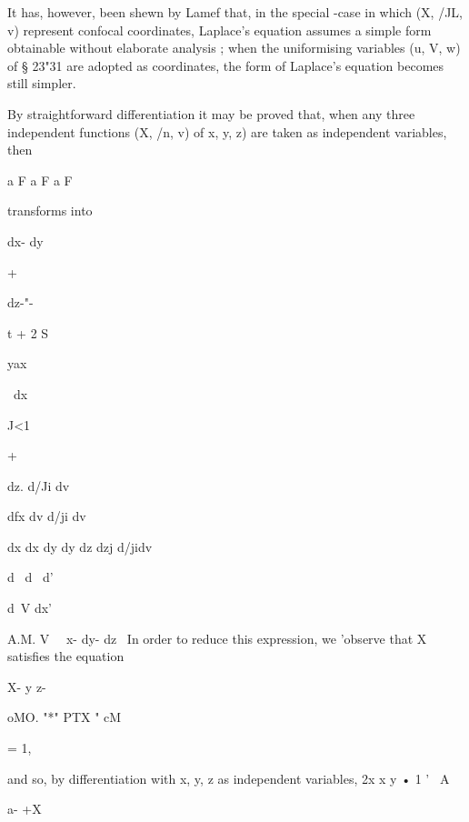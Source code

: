 {{{It has, however, been shewn by Lamef that, in the special -case in which 
(X, /JL, v) represent confocal coordinates, Laplace's equation assumes a simple 
form obtainable without elaborate analysis ; when the uniformising variables 
(u, V, w) of § 23"31 are adopted as coordinates, the form of Laplace's equation 
becomes still simpler. 

By straightforward differentiation it may be proved that, when any three 
independent functions (X, /n, v) of  x, y, z) are taken as independent variables, 
then 

a F a F a F 



transforms into 



dx- dy  



+ 



dz-"- 



t 
+ 2 S 



yax 

\ dx 



J<1 



+ 



dz. 
d/Ji dv 






dfx dv d/ji dv 

dx dx dy dy dz dzj d/jidv 



d \ d \ d'\ 



d\ V 
dx' 



A.M. V \ \   x- dy- dz \ 
In order to reduce this expression, we 'observe that X satisfies the equation 



X- y  z- 

oMO. "*" PTX "  cM  



= 1, 



and so, by differentiation with x, y, z as independent variables, 
2x   x  y  •  1  '  \  A 



a- +X 

}}}

